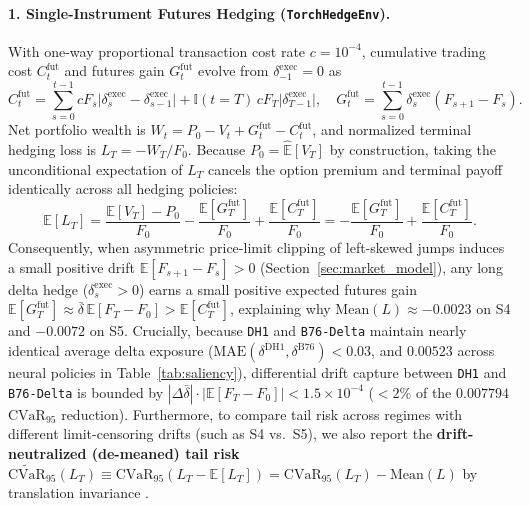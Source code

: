 \documentclass[11pt,a4paper]{article}
\begin{document}
\paragraph{1. Single-Instrument Futures Hedging (\texttt{TorchHedgeEnv}).}
With one-way proportional transaction cost rate $c = 10^{-4}$, cumulative trading cost $C_t^{\text{fut}}$ and futures gain $G_t^{\text{fut}}$ evolve from $\delta_{-1}^{\text{exec}} = 0$ as
\begin{equation}
  C_t^{\text{fut}} = \sum_{s=0}^{t-1} c F_s \big|\delta_s^{\text{exec}} - \delta_{s-1}^{\text{exec}}\big| + \mathbb{I}(t = T)\,c F_T \big|\delta_{T-1}^{\text{exec}}\big|, \quad G_t^{\text{fut}} = \sum_{s=0}^{t-1} \delta_s^{\text{exec}}(F_{s+1} - F_s).
  \label{eq:wealth_1d}
\end{equation}
Net portfolio wealth is $W_t = P_0 - V_t + G_t^{\text{fut}} - C_t^{\text{fut}}$, and normalized terminal hedging loss is $L_T = -W_T / F_0$. Because $P_0 = \widehat{\mathbb{E}}[V_T]$ by construction, taking the unconditional expectation of $L_T$ cancels the option premium and terminal payoff identically across all hedging policies:
\begin{equation}
  \mathbb{E}[L_T] = \frac{\mathbb{E}[V_T] - P_0}{F_0} - \frac{\mathbb{E}[G_T^{\text{fut}}]}{F_0} + \frac{\mathbb{E}[C_T^{\text{fut}}]}{F_0} = -\frac{\mathbb{E}[G_T^{\text{fut}}]}{F_0} + \frac{\mathbb{E}[C_T^{\text{fut}}]}{F_0}.
  \label{eq:loss_expectation}
\end{equation}
Consequently, when asymmetric price-limit clipping of left-skewed jumps induces a small positive drift $\mathbb{E}[F_{s+1} - F_s] > 0$ (Section~\ref{sec:market_model}), any long delta hedge ($\delta_s^{\text{exec}} > 0$) earns a small positive expected futures gain $\mathbb{E}[G_T^{\text{fut}}] \approx \bar{\delta}\,\mathbb{E}[F_T - F_0] > \mathbb{E}[C_T^{\text{fut}}]$, explaining why $\text{Mean}(L) \approx -0.0023$ on S4 and $-0.0072$ on S5. Crucially, because \texttt{DH1} and \texttt{B76-Delta} maintain nearly identical average delta exposure ($\text{MAE}(\delta^{\text{DH1}}, \delta^{\text{B76}}) < 0.03$, and $0.00523$ across neural policies in Table~\ref{tab:saliency}), differential drift capture between \texttt{DH1} and \texttt{B76-Delta} is bounded by $|\Delta\bar{\delta}|\cdot|\mathbb{E}[F_T - F_0]| < 1.5 \times 10^{-4}$ ($< 2\%$ of the $0.007794$ $\text{CVaR}_{95}$ reduction). Furthermore, to compare tail risk across regimes with different limit-censoring drifts (such as S4 vs.\ S5), we also report the \textbf{drift-neutralized (de-meaned) tail risk} $\widetilde{\text{CVaR}}_{95}(L_T) \equiv \text{CVaR}_{95}(L_T - \mathbb{E}[L_T]) = \text{CVaR}_{95}(L_T) - \text{Mean}(L)$ by translation invariance \citep{Rockafellar2000}.
\end{document}
